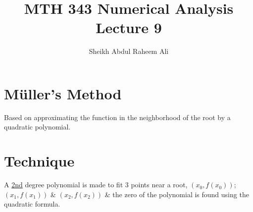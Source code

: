 \documentclass[]{article}
\title{MTH 343 Numerical Analysis Lecture 9}
\author{Sheikh Abdul Raheem Ali}
\begin{document}
\maketitle

\section*{Müller's Method}

Based on approximating the function in the neighborhood of the root by a quadratic polynomial.

\section*{Technique}

A \underline{2nd} degree polynomial is made to fit 3 points near a root, $ (x_0, f(x_0)) $; $ (x_1, f(x_1)) $ \& $ (x_2, f(x_2)) $ \& the zero of the polynomial is found using the quadratic formula.
\end{document}
